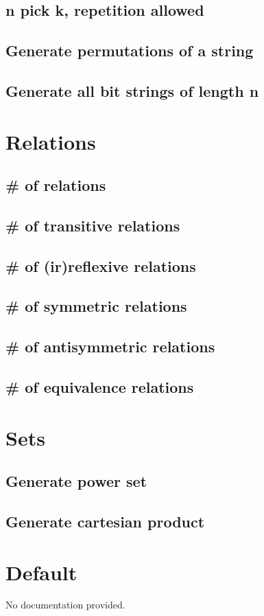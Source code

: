 \documentclass{article}
\begin{document}
\subsection{n pick k, repetition allowed}
\subsection{Generate permutations of a string}
\subsection{Generate all bit strings of length n}

\section{Relations}
\subsection{\# of relations}
\subsection{\# of transitive relations}
\subsection{\# of (ir)reflexive relations}
\subsection{\# of symmetric relations}
\subsection{\# of antisymmetric relations}
\subsection{\# of equivalence relations}

\section{Sets}
\subsection{Generate power set}
\subsection{Generate cartesian product}

\section{Default}
No documentation provided.
\end{document}
